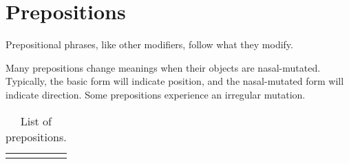 \documentclass{book}
\begin{document}
\chapter{Prepositions}

Prepositional phrases, like other modifiers, follow what they modify.

Many prepositions change meanings when their objects are nasal-mutated. Typically, the basic form will indicate position, and the nasal-mutated form will indicate direction. Some prepositions experience an irregular mutation.

\begin{longtabu}[c]{|X|X|}
    \caption{List of prepositions.}
    \centering
    
    \\ \hline
    \endfirsthead
    
    \hline
    \endhead
    
    \hline
    \endfoot
    
    \hline
    \endlastfoot
    

\end{longtabu}
\end{document}
